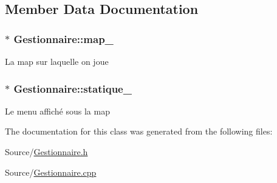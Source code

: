 \subsection{Member Data Documentation}
\hypertarget{classGestionnaire_a25cc65d005529f0cc57b6a868c1ed158}{
\subsubsection[{map\-\_\-}]{$\ast$ Gestionnaire\-::map\-\_\-\hspace{0.3cm}{\ttfamily [private]}}}\label{classGestionnaire_a25cc65d005529f0cc57b6a868c1ed158}
La map sur laquelle on joue \hypertarget{classGestionnaire_a2504521971b4ef8b9bfee050c368bb7a}{
\subsubsection[{statique\-\_\-}]{$\ast$ Gestionnaire\-::statique\-\_\-\hspace{0.3cm}{\ttfamily [private]}}}\label{classGestionnaire_a2504521971b4ef8b9bfee050c368bb7a}
Le menu affiché sous la map 

The documentation for this class was generated from the following files\-:\begin{DoxyCompactItemize}
\item 
Source/\hyperlink{Gestionnaire_8h}{Gestionnaire.\-h}\item 
Source/\hyperlink{Gestionnaire_8cpp}{Gestionnaire.\-cpp}\end{DoxyCompactItemize}
